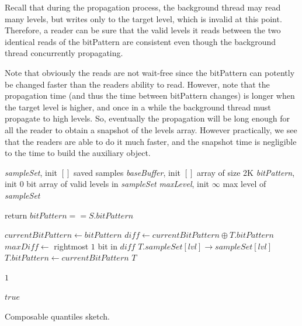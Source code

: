 Recall that during the propagation process, the background
thread may read many levels, but writes only to the target level,
which is invalid at this point.
Therefore, a reader can be sure that the valid levels it reads
between the two identical reads of the bitPattern are consistent
even though the background thread concurrently
propagating.

Note that obviously the reads are not wait-free since the
bitPattern can potently be changed faster than the readers ability
to read.
However, note that the propagation time (and thus
the time between bitPattern changes) is longer when the target
level is higher, and once in a while the background thread must
propagate to high levels.
So, eventually the propagation will be long enough for
all the reader to obtain a snapshot of the levels array. 
However practically, we see that the readers are able to do it
much faster, and the snapshot time is negligible to the time to
build the auxiliary object.
\fi

\begin{algorithm}[tb]
	\small
	\begin{multicols}{2}
	\begin{algorithmic}[1]
	
		\Vars
		\State \emph{sampleSet}, init $[ ]$ \Comment saved samples
		\State \emph{baseBuffer}, init $[ ]$ \Comment array of size 2K
		\State \emph{bitPattern}, init 0 \Comment bit array of valid levels in \emph{sampleSet}
		\State \emph{maxLevel}, init $\infty$ \Comment max level of \emph{sampleSet}
		\EndFor
	
		\Statex
			\State return $bitPattern == S.bitPattern$
		\EndProcedure
	
		\Statex
			\State $currentBitPattern \leftarrow bitPattern$
			\State $diff \leftarrow currentBitPattern \oplus T.bitPattern$
			\State $maxDiff \leftarrow $ rightmost $1$ bit in $diff$
				$T.sampleSet[lvl] \rightarrow sampleSet[lvl]$
			\EndIf
			\EndFor
			\State $T.bitPattern \leftarrow currentBitPattern$
			\Return $T$
		\EndProcedure
	
		\Statex
			\Return $1$
		\EndProcedure
	
		\Statex
			\Return $true$
		\EndProcedure
	
	\end{algorithmic}
	\end{multicols}
	\caption{Composable quantiles sketch.}
	\label{alg:composable-quantiles}
	\end{algorithm}


